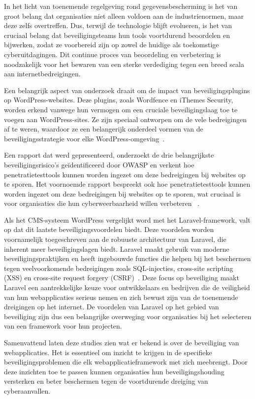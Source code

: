 In het licht van toenemende regelgeving rond gegevensbescherming 
is het van groot belang dat organisaties niet alleen voldoen aan de industrienormen, maar deze zelfs overtreffen.
Dus, terwijl de technologie blijft evolueren, is het van cruciaal belang dat beveiligingsteams hun tools voortdurend 
beoordelen en bijwerken, zodat ze voorbereid zijn op zowel de huidige als toekomstige cyberuitdagingen. Dit continue 
proces van beoordeling en verbetering is noodzakelijk voor het bewaren van een sterke verdediging tegen een breed scala 
aan internetbedreigingen.

Een belangrijk aspect van onderzoek draait om de impact van beveiligingsplugins op WordPress-websites. Deze plugins, zoals Wordfence en iThemes Security, worden 
erkend vanwege hun vermogen om een cruciale beveiligingslaag toe te voegen aan WordPress-sites. Ze zijn speciaal ontworpen om de vele bedreigingen af 
te weren, waardoor ze een belangerijk onderdeel vormen van de beveiligingsstrategie voor elke WordPress-omgeving~\autocite{Casola2020}.

Een rapport dat werd gepresenteerd, onderzoekt de drie belangrijkste beveiligingsrisico's geïdentificeerd door OWASP en verkent hoe penetratietesttools kunnen 
worden ingezet om deze bedreigingen bij websites op te sporen. Het voornoemde rapport bespreekt ook hoe 
penetratietesttools kunnen worden ingezet om deze bedreigingen bij websites op te sporen, wat cruciaal is voor organisaties die hun cyberweerbaarheid willen verbeteren
~\autocite{Sharma2023}.

Als het CMS-systeem WordPress vergelijkt word met het Laravel-framework, valt op dat dit laatste beveiligingsvoordelen biedt. Deze voordelen worden voornamelijk toegeschreven aan 
de robuuste architectuur van Laravel, die inherent meer beveiligingslagen biedt. Laravel maakt gebruik van moderne beveiligingspraktijken en heeft ingebouwde 
functies die helpen bij het beschermen tegen veelvoorkomende bedreigingen zoals SQL-injecties, cross-site scripting (XSS) en cross-site request forgery (CSRF)~\autocite{Lebedeva2023}. Deze focus 
op beveiliging maakt Laravel een aantrekkelijke keuze voor ontwikkelaars en bedrijven die de veiligheid van hun webapplicaties serieus nemen en zich bewust 
zijn van de toenemende dreigingen op het internet. De voordelen van Laravel op het gebied van beveiliging zijn dus een belangrijke overweging voor organisaties 
bij het selecteren van een framework voor hun projecten.

Samenvattend laten deze studies zien wat er bekend is over de beveiliging van webapplicaties.
Het is essentieel om inzicht te krijgen in de specifieke beveiligingsproblemen die elk webapplicatieframework met zich meebrengt. Door deze inzichten 
toe te passen kunnen organisaties hun beveiligingshouding versterken en beter beschermen tegen de voortdurende dreiging van cyberaanvallen.

